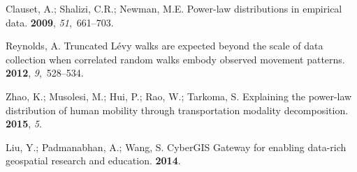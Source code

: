 \documentclass[ijgi,article,accept,moreauthors,pdftex,10pt,a4paper]{mdpi}
\theoremstyle{mdpi}
\newcounter{ex}
\newcounter{re}
\theoremstyle{mdpidefinition}
\begin{document}
\begin{thebibliography}{-------}
Clauset, A.; Shalizi, C.R.; Newman, M.E.
\newblock Power-law distributions in empirical data.
 {\bf 2009}, {\em 51},~661--703.

Reynolds, A.
\newblock Truncated L{\'e}vy walks are expected beyond the scale of data
  collection when correlated random walks embody observed movement patterns.
 {\bf 2012}, {\em
  9},~528--534.

Zhao, K.; Musolesi, M.; Hui, P.; Rao, W.; Tarkoma, S.
\newblock Explaining the power-law distribution of human mobility through
  transportation modality decomposition.
 {\bf 2015}, {\em 5}.

Liu, Y.; Padmanabhan, A.; Wang, S.
\newblock CyberGIS Gateway for enabling data-rich geospatial research and
  education.
 {\bf
  2014}.

\end{thebibliography}
\end{document}

